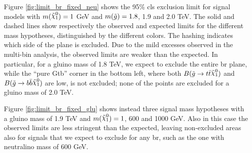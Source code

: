 Figure \ref{fig:limit_br_fixed_neu} shows the 95\% \gls{cls} exclusion limit for signal models with $m(\ninoone) = 1$ GeV and 
$m(\tilde{g}) = 1.8$, 1.9 and 2.0 TeV. The solid and dashed lines show respectively the observed and expected limits for the different 
mass hypotheses, distinguished by the different colors. The hashing indicates which side of the plane is excluded. 
Due to the mild excesses observed in the multi-bin analysis, the observed limits are weaker than the expected. 
In particular, for a gluino mass of 1.8 TeV, we expect to exclude the entire \gls{br} plane, while the ``pure Gtb'' corner 
in the bottom left, where both $B(\gluino \to t \bar{t} \ninoone)$ and $B(\gluino \to b \bar{b} \ninoone)$ are low, 
is not excluded; none of the points are excluded for a gluino mass of 2.0 TeV. 

Figure \ref{fig:limit_br_fixed_glu} shows instead three signal mass hypotheses with a gluino mass of 1.9 TeV 
and $m(\ninoone) = 1$, 600 and 1000 GeV. Also in this case the observed limits are less stringent than the expected, leaving 
non-excluded areas also for signals that we expect to exclude for any \gls{br}, such as the one with neutralino mass of 600 GeV.


